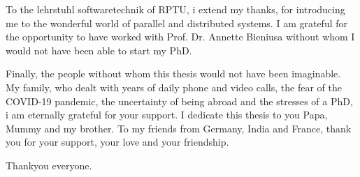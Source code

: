 To the lehrstuhl softwaretechnik of RPTU, i extend my thanks, for introducing me to the wonderful world of parallel and distributed systems. I am grateful for the opportunity to have worked with Prof. Dr. Annette Bieniusa without whom I would not have been able to start my PhD.

Finally, the people without whom this thesis would not have been imaginable. My family, who dealt with years of daily phone and video calls, the fear of the COVID-19 pandemic, the uncertainty of being abroad and the stresses of a PhD, i am eternally grateful for your support. I dedicate this thesis to you Papa, Mummy and my brother. To my friends from Germany, India and France, thank you for your support, your love and your friendship.

Thankyou everyone. 